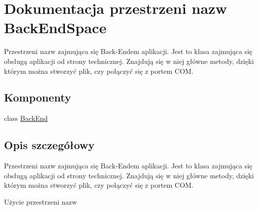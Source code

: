 \hypertarget{namespace_back_end_space}{}\section{Dokumentacja przestrzeni nazw Back\+End\+Space}
\label{namespace_back_end_space}


Przestrzeni nazw zajmująca się Back-\/\+Endem aplikacji. Jest to klasa zajmująca się obsługą aplikacji od strony technicznej. Znajdują się w niej główne metody, dzięki którym można stworzyć plik, czy połączyć się z portem C\+OM.  


\subsection*{Komponenty}
\begin{DoxyCompactItemize}
\item 
class \hyperlink{class_back_end_space_1_1_back_end}{Back\+End}
\end{DoxyCompactItemize}


\subsection{Opis szczegółowy}
Przestrzeni nazw zajmująca się Back-\/\+Endem aplikacji. Jest to klasa zajmująca się obsługą aplikacji od strony technicznej. Znajdują się w niej główne metody, dzięki którym można stworzyć plik, czy połączyć się z portem C\+OM. 

Użycie przestrzeni nazw 